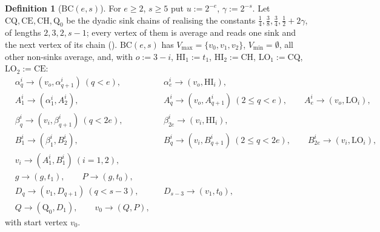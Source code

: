 \documentclass[11pt]{article}
\theoremstyle{plain}
\theoremstyle{definition}
\newtheorem{definition}[theorem]{Definition}
\newcommand{\Vmax}{V_{\max}}
\newcommand{\Vmin}{V_{\min}}
\begin{document}
\begin{definition}[$\mathrm{BC}(e,s)$]\label{def:bc}
For $e\ge2$, $s\ge5$ put $u:=2^{-e}$, $\gamma:=2^{-s}$. Let
$\mathrm{CQ},\mathrm{CE},\mathrm{CH},\mathrm{Q}_0$ be the dyadic sink
chains of  realising the constants
$\tfrac14,\tfrac38,\tfrac34,\tfrac12+2\gamma$, of lengths $2,3,2,s-1$;
every vertex of them is average and reads one sink and the next vertex
of its chain ().
$\mathrm{BC}(e,s)$ has $\Vmax=\{v_0,v_1,v_2\}$, $\Vmin=\emptyset$, all
other non-sinks average, and, with $o:=3-i$,
$\mathrm{HI}_1:=t_1$, $\mathrm{HI}_2:=\mathrm{CH}$,
$\mathrm{LO}_1:=\mathrm{CQ}$, $\mathrm{LO}_2:=\mathrm{CE}$:
\[
\begin{aligned}
&\alpha^{i}_q\to(v_{o},\alpha^{i}_{q+1})\ (q<e), &&\alpha^{i}_{e}\to(v_{o},\mathrm{HI}_i),\\
&A^{i}_1\to(\alpha^{i}_1,A^{i}_2),&&
A^{i}_q\to(v_{o},A^{i}_{q+1})\ (2\le q<e),\qquad A^{i}_{e}\to(v_{o},\mathrm{LO}_i),\\
&\beta^{i}_q\to(v_{i},\beta^{i}_{q+1})\ (q<2e),&&\beta^{i}_{2e}\to(v_{i},\mathrm{HI}_i),\\
&B^{i}_1\to(\beta^{i}_1,B^{i}_2),&&
B^{i}_q\to(v_{i},B^{i}_{q+1})\ (2\le q<2e),\qquad B^{i}_{2e}\to(v_{i},\mathrm{LO}_i),\\
&v_i\to(A^{i}_1,B^{i}_1)\ (i=1,2),&&\\
&g\to(g,t_1),\qquad P\to(g,t_0),&&\\
&D_q\to(v_1,D_{q+1})\ (q<s-3),&&D_{s-3}\to(v_1,t_0),\\
&Q\to(\mathrm{Q}_0,D_1),\qquad v_0\to(Q,P),&&
\end{aligned}
\]
with start vertex $v_0$.
\end{definition}
\end{document}
